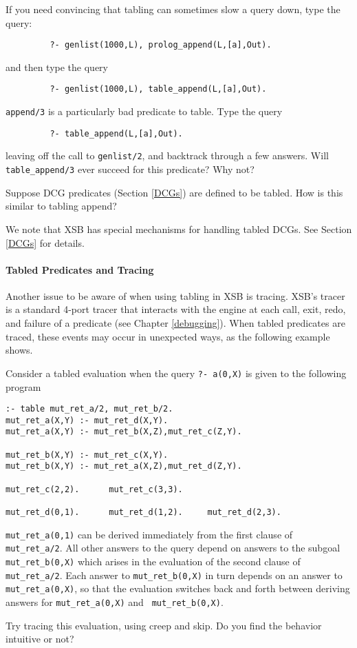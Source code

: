 \begin{exercise} \label{ex:append}
If you need convincing that tabling can sometimes slow a query down,
type the query:
\begin{verbatim}
         ?- genlist(1000,L), prolog_append(L,[a],Out).
\end{verbatim}
and then type the query
\begin{verbatim}
         ?- genlist(1000,L), table_append(L,[a],Out).
\end{verbatim}
{\tt append/3} is a particularly bad predicate to table.  Type the query
\begin{verbatim}
         ?- table_append(L,[a],Out).
\end{verbatim}
leaving off the call to {\tt genlist/2}, and backtrack through a few answers.
Will {\tt table\_append/3} ever succeed for this predicate?  Why not?

Suppose DCG predicates (Section \ref{DCGs}) are defined to be tabled.
How is this similar to tabling append?\fillBox
\end{exercise}
%
We note that XSB has special mechanisms for handling tabled DCGs.  See
Section \ref{DCGs} for details.

\paragraph{Tabled Predicates and Tracing}
Another issue to be aware of when using tabling in XSB is tracing.
XSB's tracer is a standard 4-port tracer that interacts with the
engine at each call, exit, redo, and failure of a predicate (see
Chapter \ref{debugging}).  When tabled predicates are traced, these
events may occur in unexpected ways, as the following example shows.

\begin{exercise} \label{ex:scc}

Consider a tabled evaluation when the query {\tt ?- a(0,X)} is given
to the following program
\begin{verbatim}
:- table mut_ret_a/2, mut_ret_b/2.
mut_ret_a(X,Y) :- mut_ret_d(X,Y).
mut_ret_a(X,Y) :- mut_ret_b(X,Z),mut_ret_c(Z,Y).

mut_ret_b(X,Y) :- mut_ret_c(X,Y).
mut_ret_b(X,Y) :- mut_ret_a(X,Z),mut_ret_d(Z,Y).

mut_ret_c(2,2).      mut_ret_c(3,3).

mut_ret_d(0,1).	     mut_ret_d(1,2).     mut_ret_d(2,3).
\end{verbatim}
{\tt mut\_ret\_a(0,1)} can be derived immediately from the first
clause of {\tt mut\_ret\_a/2}.  All other answers to the query depend
on answers to the subgoal {\tt mut\_ret\_b(0,X)} which arises in the
evaluation of the second clause of {\tt mut\_ret\_a/2}.  Each answer
to {\tt mut\_ret\_b(0,X)} in turn depends on an answer to {\tt
mut\_ret\_a(0,X)}, so that the evaluation switches back and forth
between deriving answers for {\tt mut\_ret\_a(0,X)} and {\tt
mut\_ret\_b(0,X)}.

Try tracing this evaluation, using creep and skip.  Do you find the
behavior intuitive or not?\fillBox
\end{exercise}


